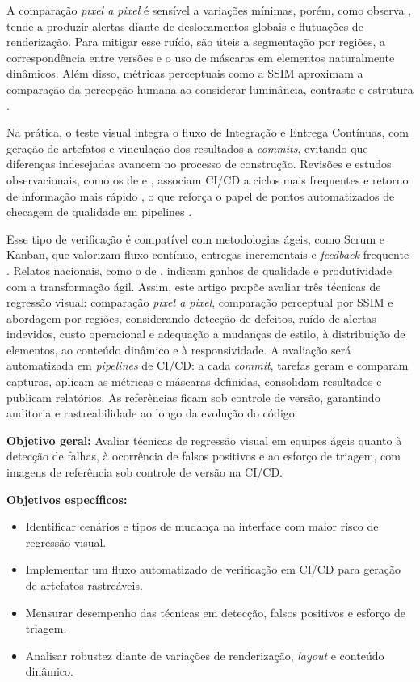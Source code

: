 \documentclass{UNESC}
\begin{document}
A comparação \emph{pixel a pixel} é sensível a variações mínimas, porém, como observa , tende a produzir alertas diante de deslocamentos globais e flutuações de renderização. Para mitigar esse ruído, são úteis a segmentação por regiões, a correspondência entre versões e o uso de máscaras em elementos naturalmente dinâmicos. Além disso, métricas perceptuais como a SSIM aproximam a comparação da percepção humana ao considerar luminância, contraste e estrutura \cite{wang2004,wang2003msssim}.

Na prática, o teste visual integra o fluxo de Integração e Entrega Contínuas, com geração de artefatos e vinculação dos resultados a \emph{commits}, evitando que diferenças indesejadas avancem no processo de construção. Revisões e estudos observacionais, como os de  e , associam CI/CD a ciclos mais frequentes e retorno de informação mais rápido \cite{regoneto2021,silva2023ic}, o que reforça o papel de pontos automatizados de checagem de qualidade em pipelines \cite{maia2024}.

Esse tipo de verificação é compatível com metodologias ágeis, como Scrum e Kanban, que valorizam fluxo contínuo, entregas incrementais e \emph{feedback} frequente \cite{bessa2018}. Relatos nacionais, como o de , indicam ganhos de qualidade e produtividade com a transformação ágil. Assim, este artigo propõe avaliar três técnicas de regressão visual: comparação \emph{pixel a pixel}, comparação perceptual por SSIM e abordagem por regiões, considerando detecção de defeitos, ruído de alertas indevidos, custo operacional e adequação a mudanças de estilo, à distribuição de elementos, ao conteúdo dinâmico e à responsividade. A avaliação será automatizada em \emph{pipelines} de CI/CD: a cada \emph{commit}, tarefas geram e comparam capturas, aplicam as métricas e máscaras definidas, consolidam resultados e publicam relatórios. As referências ficam sob controle de versão, garantindo auditoria e rastreabilidade ao longo da evolução do código.

\vspace{0.5em}
\noindent
\textbf{Objetivo geral:} Avaliar técnicas de regressão visual em equipes ágeis quanto à detecção de falhas, à ocorrência de falsos positivos e ao esforço de triagem, com imagens de referência sob controle de versão na CI/CD.

\vspace{0.5em}
\noindent
\textbf{Objetivos específicos:}
\begin{itemize}[leftmargin=2em]
    \item Identificar cenários e tipos de mudança na interface com maior risco de regressão visual.
    \item Implementar um fluxo automatizado de verificação em CI/CD para geração de artefatos rastreáveis.
    \item Mensurar desempenho das técnicas em detecção, falsos positivos e esforço de triagem.
    \item Analisar robustez diante de variações de renderização, \emph{layout} e conteúdo dinâmico.
\end{itemize}
\end{document}

